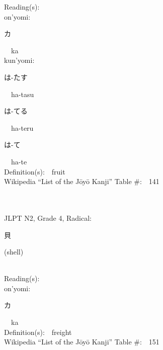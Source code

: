 \begin{multicols}{2}
Reading(s):\ \ \\
{\hspace*{1em}}on'yomi:\ \ \\
{\hspace*{2em}}{\begin{CJK}{UTF8}{min} カ \end{CJK}}\ \ ka\ \ \\
{\hspace*{1em}}kun'yomi:\ \ \\
{\hspace*{2em}}{\begin{CJK}{UTF8}{min} は-たす \end{CJK}}\ \ ha-tasu\ \ \\
{\hspace*{2em}}{\begin{CJK}{UTF8}{min} は-てる \end{CJK}}\ \ ha-teru\ \ \\
{\hspace*{2em}}{\begin{CJK}{UTF8}{min} は-て \end{CJK}}\ \ ha-te\ \ \\
Definition(s):\ \ fruit \\
Wikipedia ``List of the J\=oy\=o Kanji'' Table \#:\ \ 141 \\
\ \ \\
{\fontsize{34pt}{40pt}  }\ \ \\  %
{JLPT N2, Grade 4, Radical:\ \ {\begin{CJK}{UTF8}{min} 貝 \end{CJK}} (shell) } \\
Reading(s):\ \ \\
{\hspace*{1em}}on'yomi:\ \ \\
{\hspace*{2em}}{\begin{CJK}{UTF8}{min} カ \end{CJK}}\ \ ka\ \ \\
Definition(s):\ \ freight \\
Wikipedia ``List of the J\=oy\=o Kanji'' Table \#:\ \ 151 \\
\ \ \\
{\fontsize{34pt}{40pt}  }\ \ \\  %

\end{multicols}
